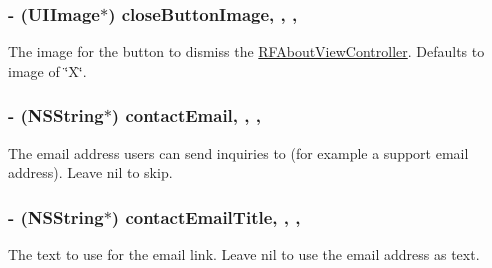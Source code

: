\subsubsection[{close\+Button\+Image}]{\setlength{\rightskip}{0pt plus 5cm}-\/ (U\+I\+Image$\ast$) close\+Button\+Image\hspace{0.3cm}{\ttfamily [read]}, {\ttfamily [write]}, {\ttfamily [nonatomic]}, {\ttfamily [weak]}}\label{interface_r_f_about_view_controller_a4c900f72531fa3ec5ca7d2db38d3fed8}
The image for the button to dismiss the \hyperlink{interface_r_f_about_view_controller}{R\+F\+About\+View\+Controller}. Defaults to image of \char`\"{}\+X\char`\"{}. \hypertarget{interface_r_f_about_view_controller_aed44f1f83aaf939e3c3100bc6551a97b}{}
\subsubsection[{contact\+Email}]{\setlength{\rightskip}{0pt plus 5cm}-\/ (N\+S\+String$\ast$) contact\+Email\hspace{0.3cm}{\ttfamily [read]}, {\ttfamily [write]}, {\ttfamily [nonatomic]}, {\ttfamily [strong]}}\label{interface_r_f_about_view_controller_aed44f1f83aaf939e3c3100bc6551a97b}
The email address users can send inquiries to (for example a support email address). Leave nil to skip. \hypertarget{interface_r_f_about_view_controller_acf9487e02af3ead791110b40d6917a80}{}
\subsubsection[{contact\+Email\+Title}]{\setlength{\rightskip}{0pt plus 5cm}-\/ (N\+S\+String$\ast$) contact\+Email\+Title\hspace{0.3cm}{\ttfamily [read]}, {\ttfamily [write]}, {\ttfamily [nonatomic]}, {\ttfamily [strong]}}\label{interface_r_f_about_view_controller_acf9487e02af3ead791110b40d6917a80}
The text to use for the email link. Leave nil to use the email address as text. \hypertarget{interface_r_f_about_view_controller_af0339e5ce8d105d3f50a48fb590a4cb4}{}
